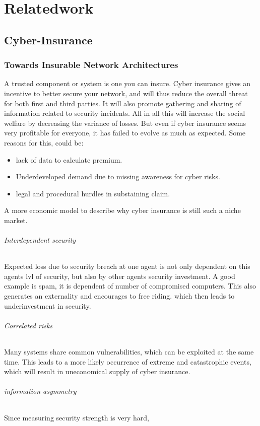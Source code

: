 \chapter{Relatedwork}
\label{chp:relatedwork} 



\section{Cyber-Insurance}




\subsection{Towards Insurable Network Architectures}\label{sec:first_section}

\cite{bohme2010modeling}
A trusted component or system is one you can insure.
Cyber insurance gives an incentive to better secure your network, and will thus reduce the overall threat for both first and third parties. It will also promote gathering and sharing of information related to security incidents. All in all this will increase the social welfare by decreasing the variance of losses. 
But even if cyber insurance seems very profitable for everyone, it has failed to evolve as much as expected.
Some reasons for this, could be:
\begin{itemize}[topsep=-1em,parsep=0em,itemsep=0em] 
 \item lack of data to calculate premium. \item Underdeveloped demand due to missing awareness for cyber risks. \item legal and procedural hurdles in substaining claim.
\end{itemize}
A more economic model to describe why cyber insurance is still such a niche market.
\subparagraph{Interdependent security}
Expected loss due to security breach at one agent is not only dependent on this agents lvl of security,
 but also by other agents security investment. A good example is spam, it is dependent of number of compromised
  computers. This also generates an externality and encourages to free riding. which then leads to
   underinvestment in security.
\subparagraph{Correlated risks}
Many systems share common vulnerabilities, which can be exploited at the same time. 
This leads to a more likely occurrence of extreme and catastrophic events,
 which will result in uneconomical supply of cyber insurance.
\subparagraph{information asymmetry}
Since measuring security strength is very hard, 
